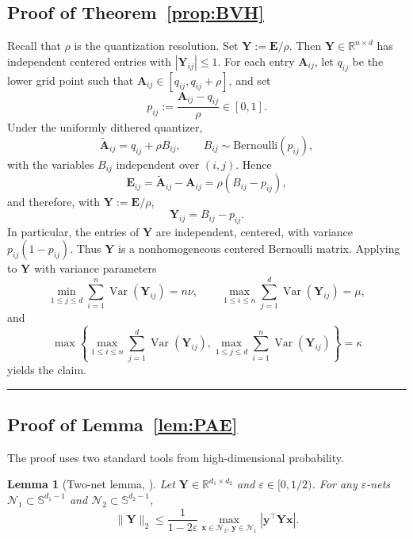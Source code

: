 \documentclass{article}
\newcommand{\twonorm}[1]{\|#1\|_2}
\newcommand{\Var}{\operatorname{Var}}   %
\newcommand{\R}{\mathbb{R}} %
\newcommand{\xb}{\mathbf{x}}
\newcommand{\yb}{\mathbf{y}}
\newcommand{\Ab}{\mathbf{A}}
\newcommand{\Eb}{\mathbf{E}}
\newcommand{\Yb}{\mathbf{Y}}
\newcommand{\Abtil}{\tilde{\Ab}}
\newcommand{\BlackBox}{\rule{1.5ex}{1.5ex}}  %
\newenvironment{proof}{\par\noindent{\bf Proof\ }}{\hfill\BlackBox\par\medskip}
\newtheorem{lemma}{Lemma}[section]
\newcommand{\abr}[1]{\left|#1\right|}
\begin{document}
\subsection{Proof of Theorem~\ref{prop:BVH}}\label{app:BVH_proof}
\begin{proof}
Recall that $\rho$ is the quantization resolution. Set $\Yb := \Eb/\rho$. Then $\Yb \in \R^{n \times d}$ has independent centered entries with $\abr{\Yb_{ij}} \le 1$.  For each entry
$\Ab_{ij}$, let $q_{ij}$ be the lower grid point such that
$\Ab_{ij}\in [q_{ij},q_{ij}+\rho]$, and set
\[
    p_{ij}:=\frac{\Ab_{ij}-q_{ij}}{\rho}\in[0,1].
\]
Under the uniformly dithered quantizer,
\[
    \Abtil_{ij}=q_{ij}+\rho B_{ij},
    \qquad B_{ij}\sim \mathrm{Bernoulli}(p_{ij}),
\]
with the variables $B_{ij}$ independent over $(i,j)$. Hence
\[
    \Eb_{ij}=\Abtil_{ij}-\Ab_{ij}
    =\rho(B_{ij}-p_{ij}),
\]
and therefore, with $\Yb:=\Eb/\rho$,
\[
    \Yb_{ij}=B_{ij}-p_{ij}.
\]
In particular, the entries of $\Yb$ are independent, centered, with variance $p_{ij}(1-p_{ij})$.
Thus $\Yb$ is a nonhomogeneous centered Bernoulli matrix. Applying
\citep[Corollary~3.18]{brailovskaya2024universality} to $\Yb$ with variance
parameters
\[
    \min_{1\le j\le d}\sum_{i=1}^n \Var(\Yb_{ij}) = n\nu,
    \qquad
    \max_{1\le i\le n}\sum_{j=1}^d \Var(\Yb_{ij}) = \mu,
\]
and
\[
    \max\left\{
        \max_{1\le i\le n}\sum_{j=1}^d \Var(\Yb_{ij}),
        \max_{1\le j\le d}\sum_{i=1}^n \Var(\Yb_{ij})
    \right\}
    =
    \kappa
\]
yields the claim.
\end{proof}
\subsection{Proof of Lemma~\ref{lem:PAE}}\label{app:PAE}

The proof uses two standard tools from high-dimensional probability.

\begin{lemma}[Two-net lemma, {\citealp[Lemma~4.4.2]{Vershynin_2026}}]\label{lem:two-net}
Let $\Yb \in \R^{d_1 \times d_2}$ and $\varepsilon \in [0, 1/2)$. For any $\varepsilon$-nets $\mathcal{N}_1 \subset \mathbb{S}^{d_1 - 1}$ and $\mathcal{N}_2 \subset \mathbb{S}^{d_2 - 1}$,
\begin{equation*}
    \twonorm{\Yb} \le \frac{1}{1 - 2\varepsilon}\max_{\xb \in \mathcal{N}_2,\, \yb \in \mathcal{N}_1} \abr{\yb^\top \Yb \xb}.
\end{equation*}
\end{lemma}
\end{document}
